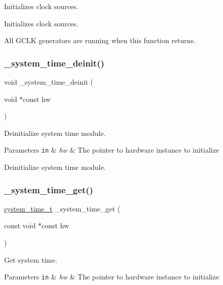 Initializes clock sources. 

Initializes clock sources.

All G\+C\+LK generators are running when this function returns. \mbox{\label{group___h_p_l_ga7bd979fd9280b6f1d630f2afa36aa3e5}} 
\subsubsection{\texorpdfstring{\+\_\+system\+\_\+time\+\_\+deinit()}{\_system\_time\_deinit()}}
{\footnotesize\ttfamily void \+\_\+system\+\_\+time\+\_\+deinit (\begin{DoxyParamCaption}\item[{void $\ast$const}]{hw }\end{DoxyParamCaption})}



Deinitialize system time module. 


\begin{DoxyParams}[1]{Parameters}
\mbox{\tt in}  & {\em hw} & The pointer to hardware instance to initialize\\
\hline
\end{DoxyParams}
Deinitialize system time module. \mbox{\label{group___h_p_l_gaef21251348cfac8ea881d7927a678fc7}} 
\subsubsection{\texorpdfstring{\+\_\+system\+\_\+time\+\_\+get()}{\_system\_time\_get()}}
{\footnotesize\ttfamily \hyperlink{group___h_p_l_ga5885ba48297c95f5c8a108cfa02e6e55}{system\+\_\+time\+\_\+t} \+\_\+system\+\_\+time\+\_\+get (\begin{DoxyParamCaption}\item[{const void $\ast$const}]{hw }\end{DoxyParamCaption})}



Get system time. 


\begin{DoxyParams}[1]{Parameters}
\mbox{\tt in}  & {\em hw} & The pointer to hardware instance to initialize \\
\hline
\end{DoxyParams}
\mbox{\label{group___h_p_l_gac4972d67e3648ca8a51181ce8fc6e616}} 
